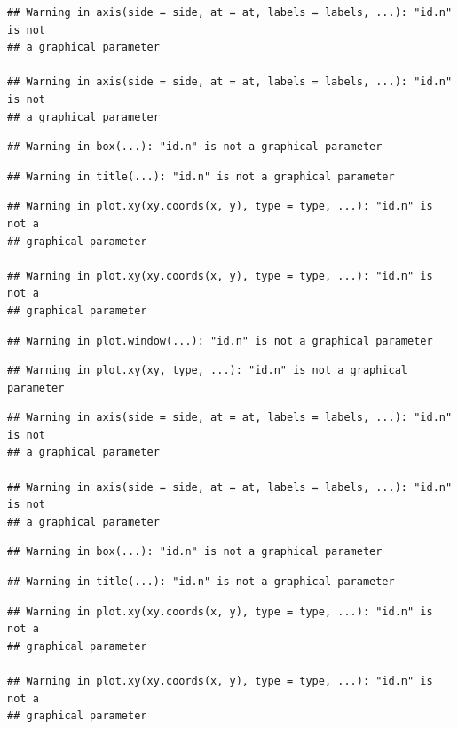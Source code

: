 \documentclass[]{book}
\begin{document}
\begin{verbatim}
## Warning in axis(side = side, at = at, labels = labels, ...): "id.n" is not
## a graphical parameter

## Warning in axis(side = side, at = at, labels = labels, ...): "id.n" is not
## a graphical parameter
\end{verbatim}

\begin{verbatim}
## Warning in box(...): "id.n" is not a graphical parameter
\end{verbatim}

\begin{verbatim}
## Warning in title(...): "id.n" is not a graphical parameter
\end{verbatim}

\begin{verbatim}
## Warning in plot.xy(xy.coords(x, y), type = type, ...): "id.n" is not a
## graphical parameter

## Warning in plot.xy(xy.coords(x, y), type = type, ...): "id.n" is not a
## graphical parameter
\end{verbatim}

\begin{verbatim}
## Warning in plot.window(...): "id.n" is not a graphical parameter
\end{verbatim}

\begin{verbatim}
## Warning in plot.xy(xy, type, ...): "id.n" is not a graphical parameter
\end{verbatim}

\begin{verbatim}
## Warning in axis(side = side, at = at, labels = labels, ...): "id.n" is not
## a graphical parameter

## Warning in axis(side = side, at = at, labels = labels, ...): "id.n" is not
## a graphical parameter
\end{verbatim}

\begin{verbatim}
## Warning in box(...): "id.n" is not a graphical parameter
\end{verbatim}

\begin{verbatim}
## Warning in title(...): "id.n" is not a graphical parameter
\end{verbatim}

\begin{verbatim}
## Warning in plot.xy(xy.coords(x, y), type = type, ...): "id.n" is not a
## graphical parameter

## Warning in plot.xy(xy.coords(x, y), type = type, ...): "id.n" is not a
## graphical parameter
\end{verbatim}
\end{document}
